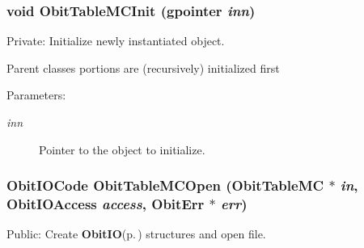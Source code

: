 \subsubsection{\setlength{\rightskip}{0pt plus 5cm}void Obit\-Table\-MCInit (gpointer {\em inn})}\label{ObitTableMC_8c_a8}


Private: Initialize newly instantiated object. 

Parent classes portions are (recursively) initialized first \begin{Desc}
\item[Parameters:]
\begin{description}
\item[{\em inn}]Pointer to the object to initialize. \end{description}
\end{Desc}
\subsubsection{\setlength{\rightskip}{0pt plus 5cm}Obit\-IOCode Obit\-Table\-MCOpen ({\bf Obit\-Table\-MC} $\ast$ {\em in}, Obit\-IOAccess {\em access}, {\bf Obit\-Err} $\ast$ {\em err})}\label{ObitTableMC_8c_a21}


Public: Create {\bf Obit\-IO}{\rm (p.\,\pageref{structObitIO})} structures and open file. 

